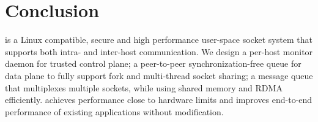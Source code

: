 \section{Conclusion}
\label{sec:conclusion}

\sys{} is a Linux compatible, secure and high performance user-space socket system that supports both intra- and inter-host communication.
We design a per-host monitor daemon for trusted control plane;
a peer-to-peer synchronization-free queue for data plane to fully support fork and multi-thread socket sharing;
a message queue that multiplexes multiple sockets, while using shared memory and RDMA efficiently.
\sys{} achieves performance close to hardware limits and improves end-to-end performance of existing applications without modification.

